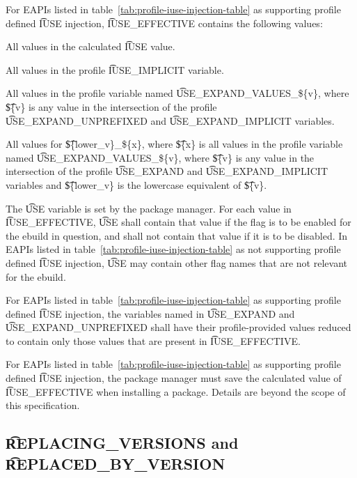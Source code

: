  For EAPIs listed in
table~\ref{tab:profile-iuse-injection-table} as supporting profile defined \t{IUSE} injection,
\t{IUSE\_EFFECTIVE} contains the following values:

\begin{compactitem}
\item All values in the calculated \t{IUSE} value.
\item All values in the profile \t{IUSE\_IMPLICIT} variable.
\item All values in the profile variable named \t{USE\_EXPAND\_VALUES\_\$\{v\}}, where \t{\$\{v\}}
    is any value in the intersection of the profile \t{USE\_EXPAND\_UNPREFIXED} and
    \t{USE\_EXPAND\_IMPLICIT} variables.
\item All values for \t{\$\{lower\_v\}\_\$\{x\}}, where \t{\$\{x\}} is all values in the profile
    variable named \t{USE\_EXPAND\_VALUES\_\$\{v\}}, where \t{\$\{v\}} is any value in the
    intersection of the profile \t{USE\_EXPAND} and \t{USE\_EXPAND\_IMPLICIT} variables and
    \t{\$\{lower\_v\}} is the lowercase equivalent of \t{\$\{v\}}.
\end{compactitem}

The \t{USE} variable is set by the package manager. For each value in \t{IUSE\_EFFECTIVE}, \t{USE}
shall contain that value if the flag is to be enabled for the ebuild in question, and shall not
contain that value if it is to be disabled. In EAPIs listed in
table~\ref{tab:profile-iuse-injection-table} as not supporting profile defined \t{IUSE} injection,
\t{USE} may contain other flag names that are not relevant for the ebuild.

For EAPIs listed in table~\ref{tab:profile-iuse-injection-table} as supporting profile defined
\t{IUSE} injection, the variables named in \t{USE\_EXPAND} and \t{USE\_EXPAND\_UNPREFIXED} shall
have their profile-provided values reduced to contain only those values that are present in
\t{IUSE\_EFFECTIVE}.

For EAPIs listed in table~\ref{tab:profile-iuse-injection-table} as supporting profile defined
\t{IUSE} injection, the package manager must save the calculated value of \t{IUSE\_EFFECTIVE} when
installing a package. Details are beyond the scope of this specification.

\subsection{\t{REPLACING\_VERSIONS} and \t{REPLACED\_BY\_VERSION}}
\label{sec:replacing-versions}

